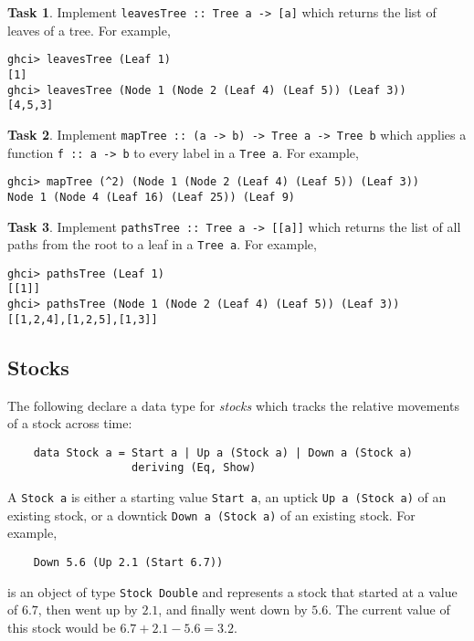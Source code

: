 \documentclass{article}[12pt]
\theoremstyle{definition}
\newtheorem{task}{Task}
\begin{document}
\begin{task}
    Implement \verb|leavesTree :: Tree a -> [a]| which returns the list of leaves of a tree. For example,
    \begin{verbatim}
ghci> leavesTree (Leaf 1)
[1]
ghci> leavesTree (Node 1 (Node 2 (Leaf 4) (Leaf 5)) (Leaf 3))
[4,5,3]\end{verbatim}
\end{task}

\begin{task}
    Implement \verb|mapTree :: (a -> b) -> Tree a -> Tree b| which applies a function \verb|f :: a -> b| to every label in a \verb|Tree a|. For example,
    \begin{verbatim}
ghci> mapTree (^2) (Node 1 (Node 2 (Leaf 4) (Leaf 5)) (Leaf 3))
Node 1 (Node 4 (Leaf 16) (Leaf 25)) (Leaf 9)\end{verbatim}
\end{task}

\begin{task}
    Implement \verb|pathsTree :: Tree a -> [[a]]| which returns the list of all paths from the root to a leaf in a \verb|Tree a|. For example,
    \begin{verbatim}
ghci> pathsTree (Leaf 1)
[[1]]
ghci> pathsTree (Node 1 (Node 2 (Leaf 4) (Leaf 5)) (Leaf 3))
[[1,2,4],[1,2,5],[1,3]]\end{verbatim}
\end{task}

\subsection{Stocks}
The following declare a data type for \emph{stocks} which tracks the relative movements of a stock across time:
\begin{verbatim}
    data Stock a = Start a | Up a (Stock a) | Down a (Stock a) 
                   deriving (Eq, Show)
\end{verbatim}
A \verb|Stock a| is either a starting value \verb|Start a|, an uptick \verb|Up a (Stock a)| of an existing stock, or a downtick \verb|Down a (Stock a)| of an existing stock. For example,
\begin{verbatim}
    Down 5.6 (Up 2.1 (Start 6.7))
\end{verbatim}
is an object of type \verb|Stock Double| and represents a stock that started at a value of $6.7$, then went up by $2.1$, and finally went down by $5.6$. The current value of this stock would be $6.7 + 2.1 - 5.6 = 3.2$. 
\end{document}
